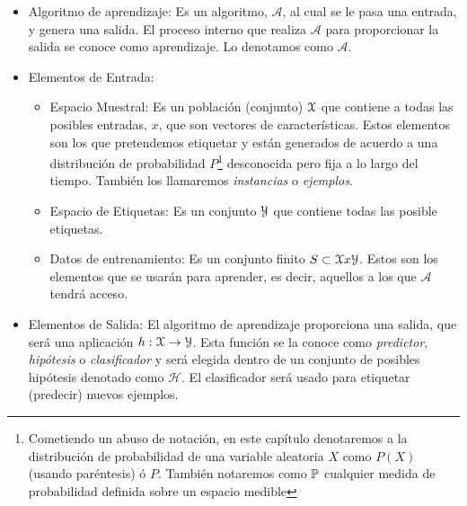     \begin{itemize}

        \item Algoritmo de aprendizaje: Es un algoritmo, $\mathcal{A}$, al cual se le pasa una entrada, y genera una salida. El proceso interno que realiza $\mathcal{A}$ para proporcionar la salida se conoce como aprendizaje. Lo denotamos como $\mathcal{A}$.

        \item Elementos de Entrada:
                
                \begin{itemize}
                    \item Espacio Muestral: Es un población (conjunto) $\mathcal{X}$ que contiene a todas las posibles entradas, $x$, que son vectores de características. Estos elementos son los que pretendemos etiquetar y están generados de acuerdo a una distribución de probabilidad $P$\footnote{Cometiendo un abuso de notación, en este capítulo denotaremos a la distribución de probabilidad de una variable aleatoria $X$ como $P(X)$ (usando paréntesis) ó $P$. También notaremos como $\mathbb{P}$  cualquier medida de probabilidad definida sobre un espacio medible} desconocida pero fija a lo largo del tiempo. También los llamaremos \textit{instancias} o \textit{ejemplos}. 
                    \item Espacio de Etiquetas: Es un conjunto $\mathcal{Y}$ que contiene todas las posible etiquetas.
                    \item  Datos de entrenamiento: Es un conjunto finito $S \subset \mathcal{X} x \mathcal{Y}$. Estos son los elementos que se usarán para aprender, es decir, aquellos a los que $\mathcal{A}$ tendrá acceso. 
                \end{itemize}
          
                
        \item Elementos de Salida: El algoritmo de aprendizaje proporciona una salida, que será una aplicación $h:\mathcal{X} \to \mathcal{Y}$. Esta función se la conoce como \textit{predictor}, \textit{hipótesis} o \textit{clasificador} y será elegida dentro de un conjunto de posibles hipótesis denotado como $\mathcal{H}$. El clasificador será usado para etiquetar (predecir) nuevos ejemplos.
        

\end{itemize}
